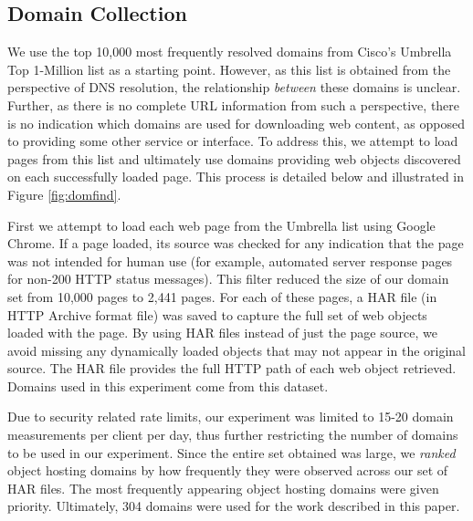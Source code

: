 \subsection{Domain Collection}

We use the top 10,000 most frequently resolved domains from Cisco's Umbrella Top
1-Million list \cite{scheitle2018} as a starting point. 
However, as this list is obtained from
the perspective of DNS resolution, the relationship \emph{between} these domains
is unclear. Further, as there is no complete URL information from such a
perspective, there is no indication which domains are used for downloading web
content, as opposed to providing some other service or interface. To address
this, we attempt to load pages from this list and ultimately use domains
providing web objects discovered on each successfully loaded page. This process
is detailed below and illustrated in Figure \ref{fig:domfind}.

First we attempt to load each web page from the Umbrella list using Google
Chrome. If a page loaded, its source was checked for any indication that the
page was not intended for human use (for example, automated server response
pages for non-200 HTTP status messages). This filter reduced the size of our
domain set from 10,000 pages to 2,441 pages. For each of these pages, a HAR file
(in HTTP Archive format file) was saved to capture the full set of web objects
loaded with the page. By using HAR files instead of just the page source, we
avoid missing any dynamically loaded objects that may not appear in the original
source. 
The HAR file provides the
full HTTP path of each web object retrieved. Domains used in this experiment
come from this dataset. 

Due to security related rate limits, our experiment was limited to 15-20 domain measurements per
client per day, thus further restricting the number of domains to be used in our
experiment. Since the entire set obtained was large, we \emph{ranked}
object hosting domains by how frequently they were observed across our set of HAR
files. The most frequently appearing object hosting domains were given priority.
Ultimately, 304 domains were used for the work described in this paper. 


